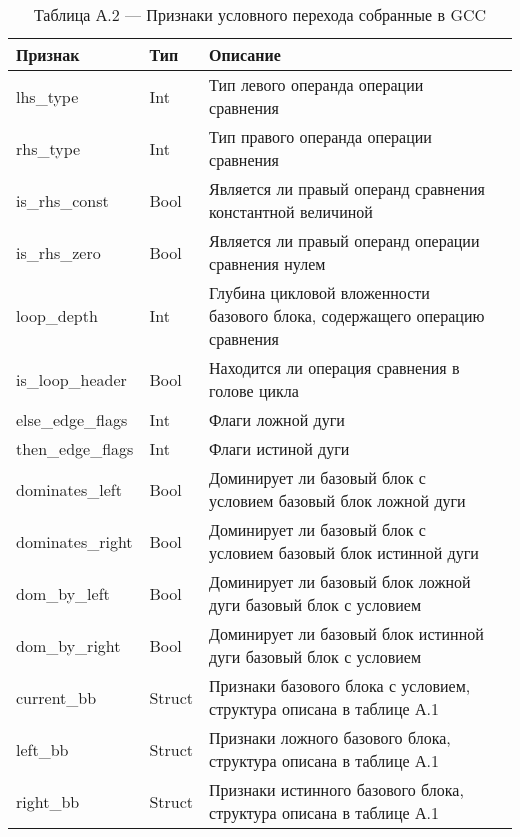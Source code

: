 \begin{table} [htbp]
	\raggedright
	\begin{threeparttable}%
		\caption*{Таблица А.2 --- Признаки условного перехода собранные в GCC}\label{op:pgo_geatures2}%
		\begin{tabular}{| m{4cm} | m{2cm} |  m{9cm}l |}
		\hline
			\hline
			\centering \textbf{Признак}			 & \centering  \textbf{Тип} &  \centering  \textbf{Описание} & \\
			\hline
			\centering lhs\_type			 & \centering  Int &   Тип левого операнда операции сравнения & \\
			\hline
			\centering rhs\_type			 & \centering  Int &    Тип правого операнда операции сравнения & \\
			\hline
			\centering is\_rhs\_const			 & \centering  Bool &    Является ли правый операнд сравнения константной величиной & \\
			\hline
			\centering is\_rhs\_zero			 & \centering  Bool &    Является ли правый операнд операции сравнения нулем & \\
			\hline
			\centering loop\_depth			 & \centering  Int &    Глубина цикловой вложенности базового блока, содержащего операцию сравнения & \\
			\hline
			\centering is\_loop\_header			 & \centering  Bool &    Находится ли операция сравнения в голове цикла  & \\
			\hline
			\centering else\_edge\_flags			 & \centering  Int &    Флаги ложной дуги & \\
			\hline
			\centering then\_edge\_flags			 & \centering  Int &    Флаги истиной дуги & \\
			\hline
			\centering dominates\_left			 & \centering  Bool &    Доминирует ли базовый блок с условием  базовый блок ложной дуги   & \\	
			\hline
			\centering dominates\_right			 & \centering  Bool &    Доминирует ли базовый блок с условием  базовый блок истинной дуги  & \\	
			\hline
			\centering dom\_by\_left			 & \centering  Bool &    Доминирует ли базовый блок ложной дуги базовый блок с условием  & \\	
			\hline
			\centering dom\_by\_right			 & \centering  Bool &    Доминирует ли базовый блок истинной дуги базовый блок с условием  & \\	
			\hline
			\centering current\_bb			 & \centering  Struct &    Признаки базового блока с условием, структура описана в таблице А.1  & \\	
			\hline
			\centering left\_bb			 & \centering  Struct &     Признаки ложного базового блока, структура описана в таблице А.1 & \\	
			\hline
			\centering right\_bb			 & \centering  Struct &    Признаки истинного базового блока, структура описана в таблице А.1 & \\	
			\hline
			\hline
		\end{tabular}
	\end{threeparttable}
\end{table}
